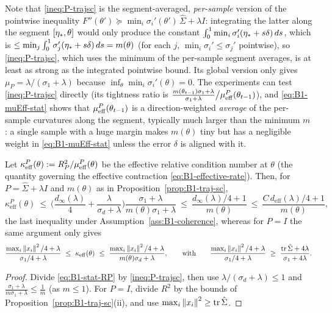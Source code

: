 Note that \eqref{ineq:P-trajsc} is the segment-averaged, \emph{per-sample} version of the pointwise
inequality $F''(\theta')\succeq\min_i\sigma_i'(\theta')\,\hat\Sigma+\lambda I$: integrating the latter along
the segment $[\eta_\ast,\theta]$ would only produce the constant $\int_0^1\min_i\sigma_i'(\eta_\ast+s\delta)\,ds$,
which is $\le\min_j\int_0^1\sigma_j'(\eta_\ast+s\delta)\,ds=m(\theta)$ (for each $j$,
$\min_i\sigma_i'\le\sigma_j'$ pointwise), so \eqref{ineq:P-trajsc}, which uses the minimum of the per-sample
segment averages, is at least as strong as the integrated pointwise bound. Its global version only gives
$\mu_P=\lambda/(\sigma_1+\lambda)$ because $\inf_\theta\min_i\sigma_i'(\theta)=0$. The experiments can test
\eqref{ineq:P-trajsc} directly (its tightness ratio is
$\frac{m(\theta_{t-1})\sigma_1+\lambda}{\sigma_1+\lambda}\big/\mu_{\mathrm{eff}}^P(\theta_{t-1})$), and
\eqref{eq:B1-muEff-stat} shows that $\mu_{\mathrm{eff}}^P(\theta_{t-1})$ is a direction-weighted \emph{average} of the per-sample
curvatures along the segment, typically much larger than the minimum $m$: a single sample with a huge
margin makes $m(\theta)$ tiny but has a negligible weight in \eqref{eq:B1-muEff-stat} unless the error
$\delta$ is aligned with it.

\begin{corollary}
\label{cor:B1-kappa-traj}
Let $\kappa_{\mathrm{eff}}^P(\theta):=R_P^2/\mu_{\mathrm{eff}}^P(\theta)$ be the effective relative condition number
at $\theta$ (the quantity governing the effective contraction \eqref{eq:B1-effective-rate}). Then, for
$P=\hat\Sigma+\lambda I$ and $m(\theta)$ as in Proposition~\ref{prop:B1-traj-sc},
\begin{equation}\label{eq:B1-kappa-traj-stat}
\kappa^P_{\mathrm{eff}}(\theta)\ \le\ \Big(\frac{d_\infty(\lambda)}{4}+\frac{\lambda}{\sigma_d+\lambda}\Big)
\frac{\sigma_1+\lambda}{m(\theta)\sigma_1+\lambda}\ \le\ \frac{d_\infty(\lambda)/4+1}{m(\theta)}
\ \le\ \frac{C\,d_{\mathrm{eff}}(\lambda)/4+1}{m(\theta)},
\end{equation}
the last inequality under Assumption~\ref{ass:B1-coherence}, whereas for $P=I$ the same argument only gives
\begin{equation}\label{eq:B1-kappa-traj-I}
\frac{\max_i\norm{x_i}^2/4+\lambda}{\sigma_1/4+\lambda}\ \le\ \kappa_{\mathrm{eff}}(\theta)\ \le\
\frac{\max_i\norm{x_i}^2/4+\lambda}{m(\theta)\sigma_d+\lambda},
\qquad\text{with}\qquad \frac{\max_i\norm{x_i}^2/4+\lambda}{\sigma_1/4+\lambda}\ \ge\ \frac{\tr\hat\Sigma+4\lambda}{\sigma_1+4\lambda}.
\end{equation}
\end{corollary}
\begin{proof}
Divide \eqref{eq:B1-stat-RP} by \eqref{ineq:P-trajsc}, then use $\lambda/(\sigma_d+\lambda)\le1$ and
$\frac{\sigma_1+\lambda}{m\sigma_1+\lambda}\le\frac1m$ (as $m\le1$). For $P=I$, divide $R^2$ by the bounds
of Proposition~\ref{prop:B1-traj-sc}(ii), and use $\max_i\left\|x_i\right\|^2\ge\operatorname{tr}\hat\Sigma$.
\end{proof}

